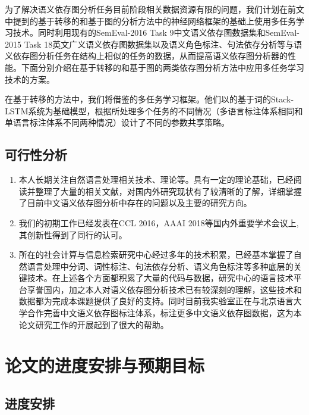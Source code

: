 为了解决语义依存图分析任务目前阶段相关数据资源有限的问题，我们计划在前文中提到的基于转移的和基于图的分析方法中的神经网络框架的基础上使用多任务学习技术。同时利用现有的SemEval-2016 Task 9中文语义依存图数据集和SemEval-2015 Task 18英文广义语义依存图数据集以及语义角色标注、句法依存分析等与语义依存图分析任务在结构上相似的任务的数据，从而提高语义依存图分析器的性能。下面分别介绍在基于转移的和基于图的两类依存图分析方法中应用多任务学习技术的方案。

在基于转移的方法中，我们将借鉴的多任务学习框架。他们以的基于词的Stack-LSTM系统为基础模型，根据所处理多个任务的不同情况（多语言标注体系相同和单语言标注体系不同两种情况）设计了不同的参数共享策略。

\subsection{可行性分析}
\begin{enumerate}
	\item 本人长期关注自然语言处理相关技术、理论等。具有一定的理论基础，已经阅读并整理了大量的相关文献，对国内外研究现状有了较清晰的了解，详细掌握了目前中文语义依存图分析中存在的问题以及主要的研究方向。
	
	\item 我们的初期工作已经发表在CCL 2016，AAAI 2018等国内外重要学术会议上,其创新性得到了同行的认可。
	
	\item 所在的社会计算与信息检索研究中心经过多年的技术积累，已经基本掌握了自然语言处理中分词、词性标注、句法依存分析、语义角色标注等多种底层的关键技术。在上述各个方面都积累了大量的代码与数据，研究中心的语言技术平台享誉国内，加之本人对语义依存图分析技术已有较深刻的理解，这些技术和数据都为完成本课题提供了良好的支持。同时目前我实验室正在与北京语言大学合作完善中文语义依存图标注体系，标注更多中文语义依存图数据，这为本论文研究工作的开展起到了很大的帮助。
	
	
\end{enumerate}
\section{论文的进度安排与预期目标}

\subsection{进度安排}

